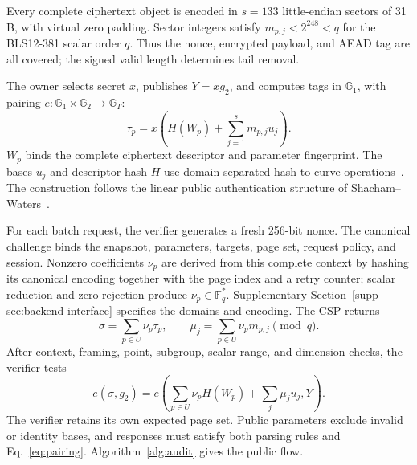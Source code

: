 \documentclass[10pt,journal]{IEEEtran}
\begin{document}
Every complete ciphertext object is encoded in $s=133$ little-endian sectors
of 31 B, with virtual zero padding. Sector integers satisfy $m_{p,j}<2^{248}<q$
for the BLS12-381 scalar order $q$. Thus the nonce, encrypted payload, and
AEAD tag are all covered; the signed valid length determines tail removal.

The owner selects secret $x$, publishes $Y=xg_2$, and computes tags in
$\mathbb G_1$, with pairing $e:\mathbb G_1\times\mathbb G_2\to\mathbb G_T$:
\begin{equation}\label{eq:tag}
\tau_p=x\left(H(W_p)+\sum_{j=1}^{s}m_{p,j}u_j\right).
\end{equation}
$W_p$ binds the complete ciphertext descriptor and parameter fingerprint.
The bases $u_j$ and descriptor hash $H$ use domain-separated hash-to-curve
operations~\cite{RFC9380}. The construction follows the linear public
authentication structure of Shacham--Waters~\cite{ShachamWaters2013}.

For each batch request, the verifier generates a fresh 256-bit nonce.
The canonical challenge binds the snapshot, parameters, targets, page set,
request policy, and session. Nonzero coefficients $\nu_p$ are derived from
this complete context by hashing its canonical encoding together with the
page index and a retry counter; scalar reduction and zero rejection produce
$\nu_p\in\mathbb F_q^*$. Supplementary Section~\ref*{supp-sec:backend-interface}
specifies the domains and encoding. The CSP returns
\begin{equation}\label{eq:aggregate}
\sigma=\sum_{p\in U}\nu_p\tau_p,\qquad
\mu_j=\sum_{p\in U}\nu_pm_{p,j}\pmod q.
\end{equation}
After context, framing, point, subgroup, scalar-range, and dimension checks,
the verifier tests
\begin{equation}\label{eq:pairing}
e(\sigma,g_2)=e\left(\sum_{p\in U}\nu_pH(W_p)+\sum_j\mu_ju_j,Y\right).
\end{equation}
The verifier retains its own expected page set. Public parameters exclude
invalid or identity bases, and responses must satisfy both parsing rules and
Eq.~\eqref{eq:pairing}. Algorithm~\ref{alg:audit} gives the public flow.
\end{document}
